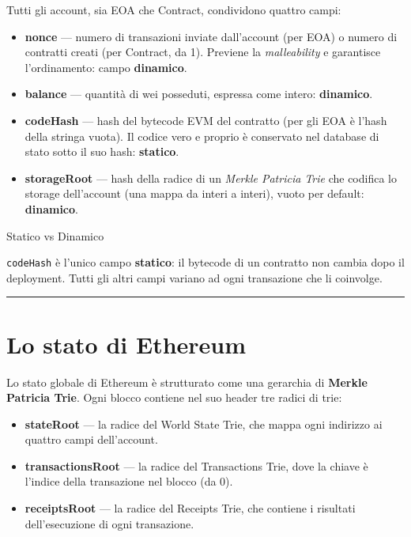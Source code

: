 \documentclass[
  italian,
  openany]{book}
\providecommand{\tightlist}{%
  \setlength{\itemsep}{0pt}\setlength{\parskip}{0pt}}
\begin{document}
Tutti gli account, sia EOA che Contract, condividono quattro campi:

\begin{itemize}
\tightlist
\item
  \textbf{nonce} --- numero di transazioni inviate dall'account (per
  EOA) o numero di contratti creati (per Contract, da 1). Previene la
  \emph{malleability} e garantisce l'ordinamento: campo
  \textbf{dinamico}.
\item
  \textbf{balance} --- quantità di wei posseduti, espressa come intero:
  \textbf{dinamico}.
\item
  \textbf{codeHash} --- hash del bytecode EVM del contratto (per gli EOA
  è l'hash della stringa vuota). Il codice vero e proprio è conservato
  nel database di stato sotto il suo hash: \textbf{statico}.
\item
  \textbf{storageRoot} --- hash della radice di un \emph{Merkle Patricia
  Trie} che codifica lo storage dell'account (una mappa da interi a
  interi), vuoto per default: \textbf{dinamico}.
\end{itemize}

\begin{callouttip}{Statico vs Dinamico}

\texttt{codeHash} è l'unico campo \textbf{statico}: il bytecode di un
contratto non cambia dopo il deployment. Tutti gli altri campi variano
ad ogni transazione che li coinvolge.

\end{callouttip}

\begin{center}\rule{0.5\linewidth}{0.5pt}\end{center}

\section{Lo stato di Ethereum}\label{lo-stato-di-ethereum}

Lo stato globale di Ethereum è strutturato come una gerarchia di
\textbf{Merkle Patricia Trie}. Ogni blocco contiene nel suo header tre
radici di trie:

\begin{itemize}
\tightlist
\item
  \textbf{stateRoot} --- la radice del World State Trie, che mappa ogni
  indirizzo ai quattro campi dell'account.
\item
  \textbf{transactionsRoot} --- la radice del Transactions Trie, dove la
  chiave è l'indice della transazione nel blocco (da 0).
\item
  \textbf{receiptsRoot} --- la radice del Receipts Trie, che contiene i
  risultati dell'esecuzione di ogni transazione.
\end{itemize}
\end{document}
